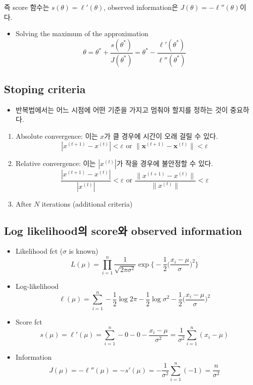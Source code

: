 \documentclass[
  letterpaper,
  DIV=11,
  numbers=noendperiod]{scrreprt}
\providecommand{\tightlist}{%
  \setlength{\itemsep}{0pt}\setlength{\parskip}{0pt}}\usepackage{longtable,booktabs,array}
\theoremstyle{definition}
\theoremstyle{definition}
\theoremstyle{remark}
\begin{document}
즉 score 함수는 \(s(\theta) = \ell ' (\theta)\), observed information은
\(J(\theta) = - \ell '' (\theta)\)이다.

\begin{itemize}
\tightlist
\item
  Solving the maximum of the approximation \[
  \theta = \theta^{*} + \frac{s(\theta^{*})}{J(\theta^{*})} = \theta^{*} - \frac{\ell ' (\theta^{*})}{\ell '' (\theta^{*})}
  \]
\end{itemize}

\subsection{Stoping criteria}\label{stoping-criteria}

\begin{itemize}
\tightlist
\item
  반복법에서는 어느 시점에 어떤 기준을 가지고 멈춰야 할지를 정하는 것이
  중요하다.
\end{itemize}

\begin{enumerate}
\def\labelenumi{\arabic{enumi}.}
\item
  Absolute convergence: 이는 \(x\)가 클 경우에 시간이 오래 걸릴 수 있다.
  \[|x^{(t+1)} -x^{(t)}| < \varepsilon \text{ or }\| \pmb{x}^{(t+1)} - \pmb{x}^{(t)} \| < \varepsilon\]
\item
  Relative convergence: 이는 \(|x^{(t)}|\)가 작을 경우에 불안정할 수
  있다. \[
  \frac{|x^{(t+1)}- x^{(t)}|}{|x^{(t)}|} < \varepsilon \text{ or }\frac{\|x^{(t+1)}- x^{(t)}\|}{\|x^{(t)}\|} < \varepsilon
  \]
\item
  After \(N\) iterations (additional criteria)
\end{enumerate}

\subsection{Log likelihood의 score와 observed
information}\label{log-likelihooduxc758-scoreuxc640-observed-information}

\begin{itemize}
\item
  Likelihood fct (\(\sigma\) is known) \[
  L(\mu) = \prod_{i=1}^n \frac{1}{\sqrt{2\pi\sigma^2}} \exp \Big\{-\frac{1}{2}\Big( \frac{x_i- \mu}{\sigma} \Big)^2 \Big\}
  \]
\item
  Log-likelihood \[
  \ell(\mu) = \sum_{i=1}^n -\frac{1}{2}\log 2\pi - \frac{1}{2}\log \sigma^2 - \frac{1}{2}\Big( \frac{x_i -\mu}{\sigma} \Big)^2
  \]
\item
  Score fct \[
  s(\mu) = \ell ' (\mu) = \sum_{i=1}^n -0 - 0 - \frac{x_i - \mu}{\sigma^2} = \frac{1}{\sigma^2} \sum_{i=1}^n  (x_i - \mu)
  \]
\item
  Information \[
  J(\mu) = -\ell '' (\mu) = - s' (\mu) = - \frac{1}{\sigma^2}\sum_{i=1}^n (-1) = \frac{n}{\sigma^2}
  \]
\end{itemize}
\end{document}

